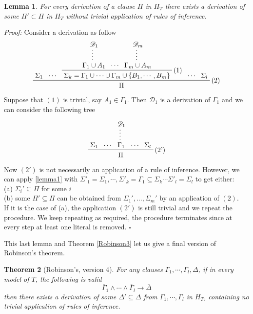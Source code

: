 \documentclass[a4paper,12pt,oneside]{book}
\newtheorem{theorem}{Theorem}[chapter]
\newtheorem{lemma}[theorem]{Lemma}
\newcommand{\D}{\mathscr{D}}
\newcommand*{\QED}{\hfill\ensuremath{\square}}
\let\e\wedge
\begin{document}
\begin{lemma}
For every derivation of a clause $\Pi$ in $H_T$ there exists a derivation of some $\Pi '\subset\Pi $ in $H_T$ without trivial application of rules of inference.
\end{lemma}

\textit{Proof:} Consider a derivation as follow
\begin{equation*}
\prftree[r]{(2)}{\prfassumption{\Sigma_1}}{\cdots}
{ \prftree[r]{(1)}{ \prfsummary{\D_1}{\Gamma_1\cup A_1} } {\cdots } { \prfsummary{\D_m}{\Gamma_m\cup A_m}} {\Sigma_k=\Gamma_1\cup\cdots\cup\Gamma_m\cup\{B_1,\cdots,B_m\}} }
{\cdots}{\prfassumption{\Sigma_l}}{\Pi}
\end{equation*}
Suppose that $(1)$ is trivial, say $A_1\in\Gamma_1$. Then $\D_1$ is a derivation of $\Gamma_1$ and we can consider the following tree

\begin{equation*}
\prftree[r]{(2')}{\prfassumption{\Sigma_1}}{\cdots}
{\prfsummary{\D_1}{\Gamma_1}}
{\cdots}{\prfassumption{\Sigma_l}}{\Pi}
\end{equation*}
Now $(2')$ is not necessarily an application of a rule of inference. However, we can apply \ref{lemma1} with  $\Sigma'_1=\Sigma_1,\cdots, \Sigma'_k=\Gamma_1\subseteq\Sigma_k\cdots\Sigma'_l=\Sigma_l$ to get either:\\
(a) $\Sigma_i' \subseteq \Pi$ for some $i$\\
(b) some $\Pi '\subseteq\Pi$ can be obtained from $\Sigma_1 ',...,\Sigma_m '$ by an application of $(2)$.\\
If it is the case of (a), the application $(2')$ is still trivial and we repeat the procedure. We keep repeating as required, the procedure terminates since at every step at least one literal is removed. \QED

\noindent This last lemma and Theorem \ref{Robinson3}  let us give a final version of Robinson's theorem.
\begin{theorem}[{Robinson's, version 4}] \label{Robinson}
For any clauses $\Gamma_1, \cdots ,\Gamma_l , \Delta$, if in every model of $T$, the following is valid 
$$
\overline{\Gamma}_1\e\cdots\e\overline{\Gamma}_l \rightarrow \overline{\Delta}
$$
then there exists a derivation of some $\Delta' \subseteq \Delta$ from $\Gamma_1, \cdots ,\Gamma_l$ in $H_T$, containing no trivial application of rules of inference.
\end{theorem}
\end{document}
